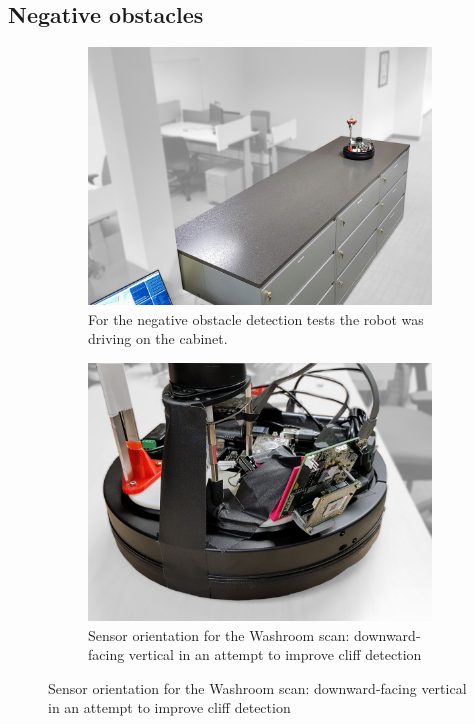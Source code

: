 \subsection{Negative obstacles}\label{negative-obstacles}

\begin{figure}[htbp]
    \centering
    \begin{subfigure}[t]{.475\textwidth}
        \includegraphics[width=\textwidth]{gfx/pictures/cliff}
        \caption{For the negative obstacle detection tests the robot was driving on the cabinet.}
        \label{fig:cliff}
    \end{subfigure}%
    \hfill%
    \begin{subfigure}[t]{.475\textwidth}
        \includegraphics[width=\textwidth]{gfx/pictures/cliff_sensor}
        \caption{Sensor orientation for the Washroom scan: downward-facing vertical in an attempt to improve cliff detection}
        \label{fig:cliff_sensor}
    \end{subfigure}
\end{figure}


